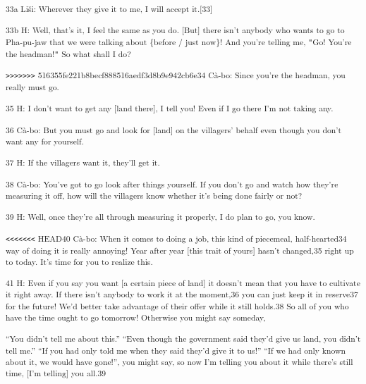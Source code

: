 {\textsuperscript{33a Liši: Wherever they give it to me, I will accept
it.[33]}}

{\textsuperscript{33b H: Well, that's it, I feel the same as you do. [But]
there isn't anybody who wants to go to Pha-pu-jaw that we were talking about \{before
/ just now\}! And you're telling me, \texttt{"}Go! You're the headman!\texttt{"}
So what shall I do? }}

{\textsuperscript{\texttt{>}\texttt{>}\texttt{>}\texttt{>}\texttt{>}\texttt{>}\texttt{>}
516355fe221b8becf888516aedf3d8b9e942cb6e34 Cà-bo: Since you're the headman, you
really must go.}}

{\textsuperscript{35 H: I don't want to get any [land there], I tell you!
Even if I go there I'm not taking any.}}

{\textsuperscript{36 Cà-bo: But you must go and look for [land] on the
villagers' behalf even though you don't want any for yourself. }}

{\textsuperscript{37 H: If the villagers want it, they'll get it. }}

{\textsuperscript{38 Cà-bo: You've got to go look after things yourself.
If you don't go and watch how they're measuring it off, how will the villagers
know whether it's being done fairly or not? }}

{\textsuperscript{39 H: Well, once they're all through measuring it properly,
I do plan to go, you know.}}

{\textsuperscript{\texttt{<}\texttt{<}\texttt{<}\texttt{<}\texttt{<}\texttt{<}\texttt{<}
HEAD40 Cà-bo: When it comes to doing a job, this kind of piecemeal, half-hearted34
way of doing it is really annoying! Year after year [this trait of yours] hasn't
changed,35 right up to today. It's time for you to realize this. }}

{\textsuperscript{41 H: Even if you say you want [a certain piece of land]
it doesn't mean that you have to cultivate it right away. If there isn't anybody
to work it at the moment,36 you can just keep it in reserve37 for the future! We'd
better take advantage of their offer while it still holds.38 So all of you who
have the time ought to go tomorrow! Otherwise you might say someday,}}

{\textsuperscript{``You didn't tell me about this.'' ``Even though the government
said they'd give us land, you didn't tell me.'' ``If you had only told me when
they said they'd give it to us!'' ``If we had only known about it, we would have
gone!'', you might say, so now I'm telling you about it while there's still time,
[I'm telling] you all.39}}

